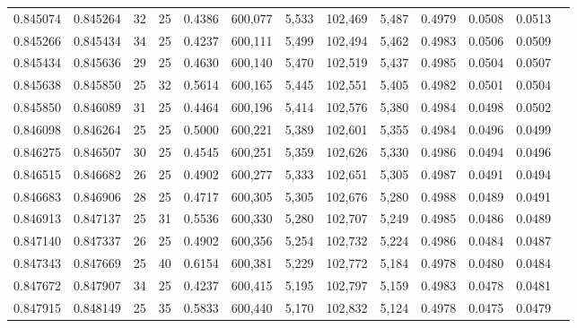 \begin{tabular}{rrrrrrrrrrrrr}
0.845074 & 0.845264 &    32 &  25 &                                     0.4386 & 600,077 &   5,533 & 102,469 &   5,487 & 0.4979 & 0.0508 & 0.0513 \\
0.845266 & 0.845434 &    34 &  25 &                                     0.4237 & 600,111 &   5,499 & 102,494 &   5,462 & 0.4983 & 0.0506 & 0.0509 \\
0.845434 & 0.845636 &    29 &  25 &                                     0.4630 & 600,140 &   5,470 & 102,519 &   5,437 & 0.4985 & 0.0504 & 0.0507 \\
0.845638 & 0.845850 &    25 &  32 &                                     0.5614 & 600,165 &   5,445 & 102,551 &   5,405 & 0.4982 & 0.0501 & 0.0504 \\
0.845850 & 0.846089 &    31 &  25 &                                     0.4464 & 600,196 &   5,414 & 102,576 &   5,380 & 0.4984 & 0.0498 & 0.0502 \\
0.846098 & 0.846264 &    25 &  25 &                                     0.5000 & 600,221 &   5,389 & 102,601 &   5,355 & 0.4984 & 0.0496 & 0.0499 \\
0.846275 & 0.846507 &    30 &  25 &                                     0.4545 & 600,251 &   5,359 & 102,626 &   5,330 & 0.4986 & 0.0494 & 0.0496 \\
0.846515 & 0.846682 &    26 &  25 &                                     0.4902 & 600,277 &   5,333 & 102,651 &   5,305 & 0.4987 & 0.0491 & 0.0494 \\
0.846683 & 0.846906 &    28 &  25 &                                     0.4717 & 600,305 &   5,305 & 102,676 &   5,280 & 0.4988 & 0.0489 & 0.0491 \\
0.846913 & 0.847137 &    25 &  31 &                                     0.5536 & 600,330 &   5,280 & 102,707 &   5,249 & 0.4985 & 0.0486 & 0.0489 \\
0.847140 & 0.847337 &    26 &  25 &                                     0.4902 & 600,356 &   5,254 & 102,732 &   5,224 & 0.4986 & 0.0484 & 0.0487 \\
0.847343 & 0.847669 &    25 &  40 &                                     0.6154 & 600,381 &   5,229 & 102,772 &   5,184 & 0.4978 & 0.0480 & 0.0484 \\
0.847672 & 0.847907 &    34 &  25 &                                     0.4237 & 600,415 &   5,195 & 102,797 &   5,159 & 0.4983 & 0.0478 & 0.0481 \\
0.847915 & 0.848149 &    25 &  35 &                                     0.5833 & 600,440 &   5,170 & 102,832 &   5,124 & 0.4978 & 0.0475 & 0.0479 \\

\end{tabular}
